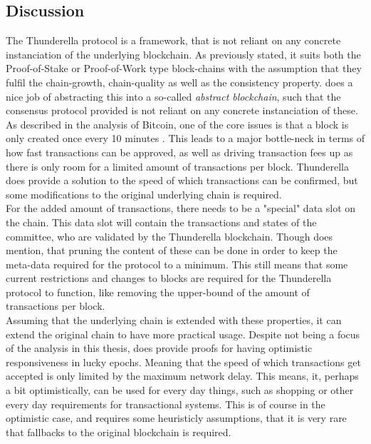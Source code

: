 \subsection{Discussion}
\label{subsec:thunder-discussion}


The Thunderella protocol is a framework, that is not reliant on any concrete instanciation of the underlying blockchain. As previously stated, it suits both the Proof-of-Stake or Proof-of-Work type block-chains with the assumption that they fulfil the chain-growth, chain-quality as well as the consistency property. \cite{thunderella} does a nice job of abstracting this into a so-called \emph{abstract blockchain}, such that the consensus protocol provided is not reliant on any concrete instanciation of these. As described in the analysis of Bitcoin, one of the core issues is that a block is only created once every 10 minutes  \cite{bitcoin-scalability}. This leads to a major bottle-neck in terms of how fast transactions can be approved, as well as driving transaction fees up as there is only room for a limited amount of transactions per block. Thunderella does provide a solution to the speed of which transactions can be confirmed, but some modifications to the original underlying chain is required.\\

For the added amount of transactions, there needs to be a "special" data slot on the chain. This data slot will contain the transactions and states of the committee, who are validated by the Thunderella blockchain. Though  \cite{thunderella} does mention, that pruning the content of these can be done in order to keep the meta-data required for the protocol to a minimum. This still means that some current restrictions and changes to blocks are required for the Thunderella protocol to function, like removing the upper-bound of the amount of transactions per block.\\

Assuming that the underlying chain is extended with these properties, it can extend the original chain to have more practical usage. Despite not being a focus of the analysis in this thesis, \cite{thunderella} does provide proofs for having optimistic responsiveness in lucky epochs. Meaning that the speed of which transactions get accepted is only limited by the maximum network delay. This means, it, perhaps a bit optimistically, can be used for every day things, such as shopping or other every day requirements for transactional systems. This is of course in the optimistic case, and requires some heuristicly assumptions, that it is very rare that fallbacks to the original blockchain is required.\\


